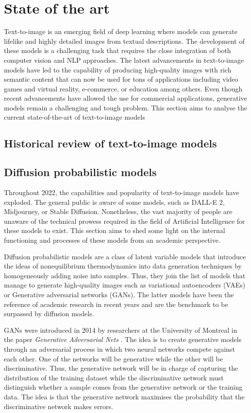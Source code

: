 \chapter{State of the art} \label{sec:colours}

Text-to-image is an emerging field of deep learning where models can generate lifelike and highly detailed images from textual descriptions.  The development of these models is a challenging task that requires the close integration of both computer vision and NLP approaches. The latest advancements in text-to-image models have led to the capability of producing high-quality images with rich semantic content that can now be used for tons of applications including video games and virtual reality, e-commerce, or education among others. Even though recent advancements have allowed the use for commercial applications, generative models remain a challenging and tough problem. This section aims to analyse the current state-of-the-art of text-to-image models

\section{Historical review of text-to-image models}

\section{Diffusion probabilistic models}

Throughout 2022, the capabilities and popularity of text-to-image models have exploded. The general public is aware of some models, such as DALL-E 2, Midjourney, or Stable Diffusion. Nonetheless, the vast majority of people are unaware of the technical prowess required in the field of Artificial Intelligence for these models to exist. This section aims to shed some light on the internal functioning and processes of these models from an academic perspective.

Diffusion probabilistic models are a class of latent variable models that introduce the ideas of nonequilibrium thermodynamics into data generation techniques by homogeneously adding noise into samples. Thus, they join the list of models that manage to generate high-quality images such as variational autoencoders (VAEs) or Generative adversarial networks (GANs). The latter models have been the reference of academic research in recent years and are the benchmark to be surpassed by diffusion models. 

GANs were introduced in 2014 by researchers at the University of Montreal in the paper \textit{Generative Adversarial Nets} \cite{goodfellow2020generative}. The idea is to create generative models through an adversarial process in which two neural networks compete against each other.  One of the networks will be generative while the other will be discriminative. Thus, the generative network will be in charge of capturing the distribution of the training dataset while the discriminative network must distinguish whether a sample comes from the generative network or the training data. The idea is that the generative network maximises the probability that the discriminative network makes errors. 

